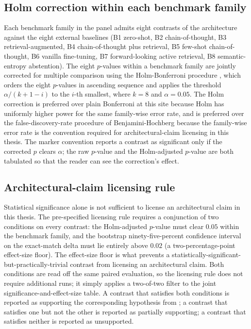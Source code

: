 \subsection{Holm correction within each benchmark family}
\label{sec:sig-holm}

Each benchmark family in the panel admits eight contrasts of the architecture against the eight external baselines (B1 zero-shot, B2 chain-of-thought, B3 retrieval-augmented, B4 chain-of-thought plus retrieval, B5 few-shot chain-of-thought, B6 vanilla fine-tuning, B7 forward-looking active retrieval, B8 semantic-entropy abstention). The eight $p$-values within a benchmark family are jointly corrected for multiple comparison using the Holm-Bonferroni procedure \cite{holm1979simple}, which orders the eight $p$-values in ascending sequence and applies the threshold $\alpha/(k+1-i)$ to the $i$-th smallest, where $k = 8$ and $\alpha = 0.05$. The Holm correction is preferred over plain Bonferroni at this site because Holm has uniformly higher power for the same family-wise error rate, and is preferred over the false-discovery-rate procedure of Benjamini-Hochberg because the family-wise error rate is the convention required for architectural-claim licensing in this thesis. The marker convention reports a contrast as significant only if the corrected $p$ clears $\alpha$; the raw $p$-value and the Holm-adjusted $p$-value are both tabulated so that the reader can see the correction's effect.

\subsection{Architectural-claim licensing rule}
\label{sec:sig-licensing}

Statistical significance alone is not sufficient to license an architectural claim in this thesis. The pre-specified licensing rule requires a conjunction of two conditions on every contrast: the Holm-adjusted $p$-value must clear $0.05$ within the benchmark family, and the bootstrap ninety-five-percent confidence interval on the exact-match delta must lie entirely above $0.02$ (a two-percentage-point effect-size floor). The effect-size floor is what prevents a statistically-significant-but-practically-trivial contrast from licensing an architectural claim. Both conditions are read off the same paired evaluation, so the licensing rule does not require additional runs; it simply applies a two-of-two filter to the joint significance-and-effect-size table. A contrast that satisfies both conditions is reported as supporting the corresponding hypothesis from ; a contrast that satisfies one but not the other is reported as partially supporting; a contrast that satisfies neither is reported as unsupported.

